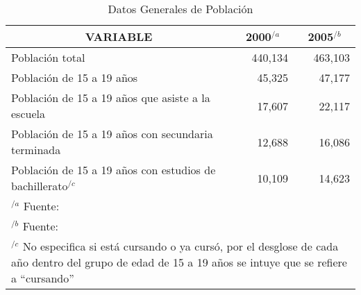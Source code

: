 \begin{table}
	\centering
    \caption{Datos Generales de Poblaci\'on}
    \label{tbl:INEGI:PoblacionEstudiaIrapuato}
    \begin{tabular}{p{4in}|r|r}
        \multicolumn{1}{c|}{VARIABLE}
        	& \multicolumn{1}{c|}{2000$^{/a}$}
        	& \multicolumn{1}{c}{2005$^{/b}$} \\
        \hline \hline
        Poblaci\'on total & 440,134 & 463,103 \\
        Poblaci\'on de 15 a 19 a\~nos & 45,325 & 47,177 \\
        Poblaci\'on de 15 a 19 a\~nos que asiste a la escuela & 17,607 & 22,117 \\
        Poblaci\'on de 15 a 19 a\~nos con secundaria terminada & 12,688 & 16,086 \\
        Poblaci\'on de 15 a 19 a\~nos con estudios de bachillerato$^{/c}$ & 10,109 & 14,623 \\
        \hline
        \multicolumn{3}{l}{$^{/a}$ \footnotesize Fuente: \citep{Inegi2000}} \\
        \multicolumn{3}{l}{$^{/b}$ \footnotesize Fuente: \citep{Inegi2005}} \\
        \multicolumn{3}{p{5.4in}}{$^{/c}$ \footnotesize No especifica si est\'a cursando o ya curs\'o, por el desglose de cada a\~no dentro del grupo de edad de 15 a 19 a\~nos se intuye que se refiere a ``cursando''}
    \end{tabular}
\end{table}
